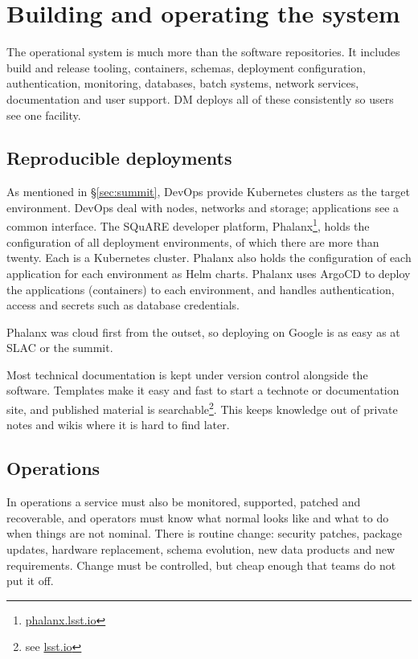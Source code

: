 \section{Building and operating the system}
\label{sec:software}

The operational system is much more than the software repositories.
It includes build and release tooling, containers, schemas, deployment configuration, authentication, monitoring, databases, batch systems, network services, documentation and user support.
DM deploys all of these consistently so users see one facility.

\subsection{Reproducible deployments}
\label{sec:deployments}

As mentioned in \S\ref{sec:summit}, DevOps provide Kubernetes clusters as the target environment.
DevOps deal with nodes, networks and storage; applications see a common interface.
The SQuARE developer platform, Phalanx\footnote{\url{phalanx.lsst.io}}, holds the configuration of all deployment environments, of which there are more than twenty.
Each is a Kubernetes cluster.
Phalanx also holds the configuration of each application for each environment as Helm charts.
Phalanx uses ArgoCD to deploy the applications (containers) to each environment, and handles authentication, access and secrets such as database credentials.

Phalanx was cloud first from the outset, so deploying on Google is as easy as at SLAC or the summit.

Most technical documentation is kept under version control alongside the software.
Templates make it easy and fast to start a technote or documentation site, and published material is searchable\footnote{see \url{lsst.io}}.
This keeps knowledge out of private notes and wikis where it is hard to find later.

\subsection{Operations}
\label{sec:operations}

In operations a service must also be monitored, supported, patched and recoverable, and operators must know what normal looks like and what to do when things are not nominal.
There is routine change: security patches, package updates, hardware replacement, schema evolution, new data products and new requirements.
Change must be controlled, but cheap enough that teams do not put it off.

